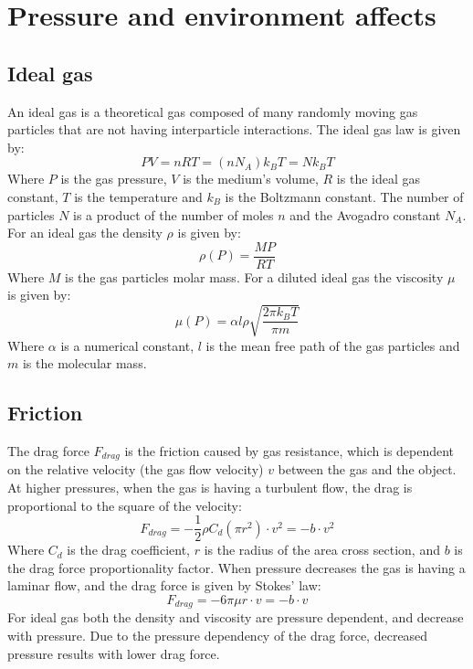 \documentclass[\main/master.tex]{subfiles}
\begin{document}
\section{Pressure and environment affects}
\subsection{Ideal gas}
An ideal gas is a theoretical gas composed of many randomly moving gas particles that are not having interparticle interactions. The ideal gas law is given by:
\begin{equation}
PV = nRT = (n N_A) k_B T = N k_B T  \label{eqn:ideal-gasses}
\end{equation}
Where $P$ is the gas pressure, $V$ is the medium's volume, $R$ is the ideal gas constant, $T$ is the temperature and $k_B$ is the Boltzmann constant. The number of particles $N$ is a product of the number of moles $n$ and the Avogadro constant $N_A$. For an ideal gas the density $\rho$ is given by:
\begin{equation}
\rho(P) = \frac{MP}{RT}     \label{eqn:ideal density}
\end{equation}
Where $M$ is the gas particles molar mass. For a diluted ideal gas the viscosity $\mu$ is given by:
\begin{equation}
\mu(P) = \alpha l \rho \sqrt{\frac{2\pi k_B  T}{\pi m}}      \label{eqn:viscosity}
\end{equation}
Where $\alpha$ is a numerical constant, $l$ is the mean free path of the gas particles and $m$ is the molecular mass. 

\subsection{Friction}
The drag force $F_{drag}$ is the friction caused by gas resistance, which is dependent on the relative velocity (the gas flow velocity) $v$ between the gas and the object. At higher pressures, when the gas is having a turbulent flow, the drag is proportional to the square of the velocity:
\begin{equation}
F_{drag} = -\frac{1}{2}\rho C_d (\pi r^2) \cdot v^2 = -b\cdot v^2 
\label{eqn:drag force}
\end{equation}
Where $C_d$ is the drag coefficient, $r$ is the radius of the area cross section, and $b$ is the drag force proportionality factor. When pressure decreases the gas is having a laminar flow, and the drag force is given by Stokes' law:
\begin{equation}
F_{drag} = -6\pi\mu r\cdot v = -b\cdot v
\label{eqn:drag force}
\end{equation}
For ideal gas both the density and viscosity are pressure dependent, and decrease with pressure. Due to the pressure dependency of the drag force, decreased pressure results with lower drag force.
\end{document}
